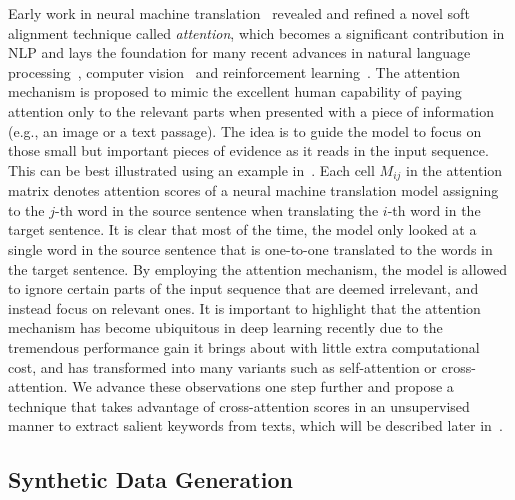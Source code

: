 %
Early work in neural machine translation~\cite{luong2015effective, bahdanau2014neural} revealed and refined a novel soft alignment technique called \emph{attention}, which becomes a significant contribution in NLP and lays the foundation for many recent advances in natural language processing~\cite{vaswani2017attention, devlin2019bert}, computer vision~\cite{dosovitskiy2020image, liu2021swin} and reinforcement learning~\cite{tang2020neuroevolution, shen2019self}.
%
The attention mechanism is proposed to mimic the excellent human capability of paying attention only to the relevant parts when presented with a piece of information (e.g., an image or a text passage).
%
The idea is to guide the model to focus on those small but important pieces of evidence as it reads in the input sequence.
%
This can be best illustrated using an example in~.
%
Each cell $M_{ij}$ in the attention matrix denotes attention scores of a neural machine translation model assigning to the $j$-th word in the source sentence when translating the $i$-th word in the target sentence.
%
It is clear that most of the time, the model only looked at a single word in the source sentence that is one-to-one translated to the words in the target sentence.
%
By employing the attention mechanism, the model is allowed to ignore certain parts of the input sequence that are deemed irrelevant, and instead focus on relevant ones.
%
It is important to highlight that the attention mechanism has become ubiquitous in deep learning recently due to the tremendous performance gain it brings about with little extra computational cost, and has transformed into many variants such as self-attention or cross-attention.
%
We advance these observations one step further and propose a technique that takes advantage of cross-attention scores in an unsupervised manner to extract salient keywords from texts, which will be described later in~.


\subsection{Synthetic Data Generation}


